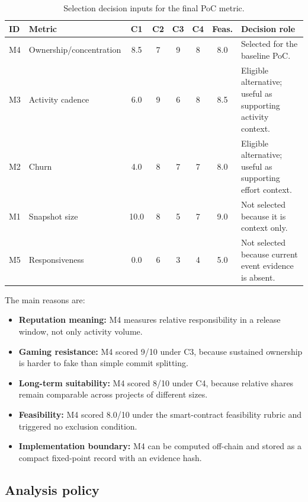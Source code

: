 \begin{table}[H]
\centering
\scriptsize
\renewcommand{\arraystretch}{1.08}
\begin{tabularx}{\textwidth}{p{1.0cm}p{3.5cm}cccccX}
\toprule
\textbf{ID} & \textbf{Metric} & \textbf{C1} & \textbf{C2} & \textbf{C3} & \textbf{C4} & \textbf{Feas.} & \textbf{Decision role} \\
\midrule
M4 & Ownership/concentration & 8.5 & 7 & 9 & 8 & 8.0 & Selected for the baseline PoC. \\
M3 & Activity cadence & 6.0 & 9 & 6 & 8 & 8.5 & Eligible alternative; useful as supporting activity context. \\
M2 & Churn & 4.0 & 8 & 7 & 7 & 8.0 & Eligible alternative; useful as supporting effort context. \\
M1 & Snapshot size & 10.0 & 8 & 5 & 7 & 9.0 & Not selected because it is context only. \\
M5 & Responsiveness & 0.0 & 6 & 3 & 4 & 5.0 & Not selected because current event evidence is absent. \\
\bottomrule
\end{tabularx}
\caption{Selection decision inputs for the final PoC metric.}
\label{tab:poc_selection_decision_inputs}
\end{table}

The main reasons are:
\begin{itemize}[leftmargin=*]
  \item \textbf{Reputation meaning:} M4 measures relative responsibility in a release window, not only activity volume.
  \item \textbf{Gaming resistance:} M4 scored 9/10 under C3, because sustained ownership is harder to fake than simple commit splitting.
  \item \textbf{Long-term suitability:} M4 scored 8/10 under C4, because relative shares remain comparable across projects of different sizes.
  \item \textbf{Feasibility:} M4 scored 8.0/10 under the smart-contract feasibility rubric and triggered no exclusion condition.
  \item \textbf{Implementation boundary:} M4 can be computed off-chain and stored as a compact fixed-point record with an evidence hash.
\end{itemize}

\subsection{Analysis policy}
\label{sec:selected_metric_policy}

